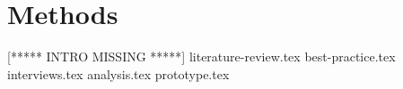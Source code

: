 
\chapter{Methods}
[***** INTRO MISSING *****]
{literature-review.tex}
{best-practice.tex}
{interviews.tex}
{analysis.tex}
{prototype.tex}
